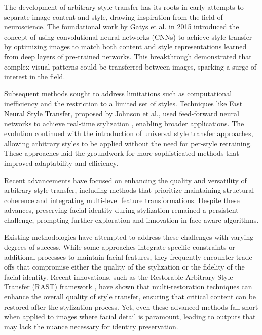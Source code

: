 \documentclass{article}
\begin{document}
The development of arbitrary style transfer has its roots in early attempts to separate image content and style, drawing inspiration from the field of neuroscience. The foundational work by Gatys et al. \cite{gatys2015neural} in 2015 introduced the concept of using convolutional neural networks (CNNs) to achieve style transfer by optimizing images to match both content and style representations learned from deep layers of pre-trained networks. This breakthrough demonstrated that complex visual patterns could be transferred between images, sparking a surge of interest in the field.

Subsequent methods sought to address limitations such as computational inefficiency and the restriction to a limited set of styles. Techniques like Fast Neural Style Transfer, proposed by Johnson et al., used feed-forward neural networks to achieve real-time stylization \cite{johnson2016perceptual, li2017universal}, enabling broader applications. The evolution continued with the introduction of universal style transfer approaches, allowing arbitrary styles to be applied without the need for per-style retraining. These approaches laid the groundwork for more sophisticated methods that improved adaptability and efficiency.

Recent advancements have focused on enhancing the quality and versatility of arbitrary style transfer, including methods that prioritize maintaining structural coherence and integrating multi-level feature transformations. Despite these advances, preserving facial identity during stylization remained a persistent challenge, prompting further exploration and innovation in face-aware algorithms.

Existing methodologies have attempted to address these challenges with varying degrees of success. While some approaches integrate specific constraints or additional processes to maintain facial features, they frequently encounter trade-offs that compromise either the quality of the stylization or the fidelity of the facial identity. Recent innovations, such as the Restorable Arbitrary Style Transfer (RAST) framework \cite{Ma_2023_WACV}, have shown that multi-restoration techniques can enhance the overall quality of style transfer, ensuring that critical content can be restored after the stylization process. Yet, even these advanced methods fall short when applied to images where facial detail is paramount, leading to outputs that may lack the nuance necessary for identity preservation.
\end{document}

